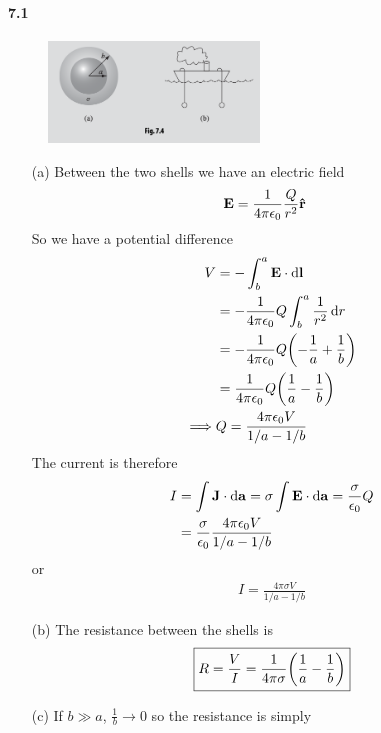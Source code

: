 \documentclass[../main.tex]{subfiles}
\begin{document}
\newpage
\paragraph{7.1}
\begin{figure}[ht]
    \centering
    \includegraphics[width=0.5\textwidth]{hw11_2.png}
\end{figure}
\begin{itemize}
    \item [(a)] Between the two shells we have an electric field
    \begin{align*}
        \vb E &= \frac{1}{4\pi\epsilon_0} \frac{Q}{r^2} \vu r
    \end{align*}
    So we have a potential difference
    \begin{align*}
        V &= -\int_b^a \vb E \cdot \dd{\vb l} \\
        &= -\ke Q \int_b^a \frac{1}{r^2} \dd{r} \\
        &= -\ke Q \qt(
            -\frac{1}{a} + \frac{1}{b}
        ) \\
        &= \ke Q \qt(
            \frac{1}{a} - \frac{1}{b}
        ) \\
        \implies & Q = \frac{4\pi\epsilon_0 V}{1/a - 1/b}
    \end{align*}
    The current is therefore
    \begin{align*}
        I &= \int \vb J \cdot \dd{\vb a} = \sigma \int \vb E \cdot \dd{\vb a}
        = \frac{\sigma}{\epsilon_0} Q \\
        &= \frac{\sigma}{\epsilon_0} \frac{4\pi\epsilon_0 V}{1/a - 1/b} \\
    \end{align*}
    or
    \begin{align*}
        \boxed{I = \frac{4\pi\sigma V}{1/a - 1/b}}
    \end{align*}
    \item [(b)] The resistance between the shells is
    \begin{align*}
        \boxed{R = \frac{V}{I} = \frac{1}{4\pi\sigma} \qt(
            \frac{1}{a} - \frac{1}{b}
        )}
    \end{align*}
    \item [(c)] If $b \gg a$, $\frac{1}{b} \to 0$ so the resistance is simply

\end{itemize}
\end{document}
